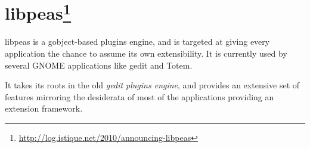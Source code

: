 
\section[libpeas]{libpeas\footnote{\url{http://log.istique.net/2010/announcing-libpeas}}}\label{sec:peas}

libpeas is a gobject-based plugins engine, and is targeted at giving every application the chance to assume its own extensibility. It is currently used by several GNOME applications like gedit and Totem.

It takes its roots in the old \emph{gedit plugins engine}, and provides an extensive set of features mirroring the desiderata of most of the applications providing an extension framework.
